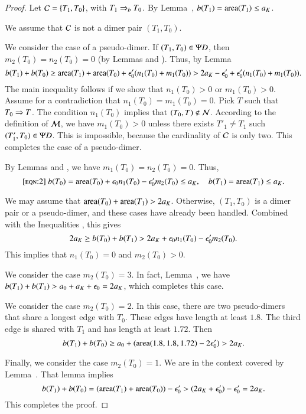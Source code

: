 \begin{proof}  Let $\mathcal C = \{T_1,T_0\}$, with $T_1\Rightarrow_{b} T_0$. By Lemma~,
$b(T_1)={\operatorname{area}}(T_1)\le a_K$.  

We assume that $\mathcal C$ is not a dimer pair $(T_1,T_0)$.


We consider the case of a pseudo-dimer.
If $(T_1,T_0)\in\Psi D$, then $m_2(T_0)=n_2(T_0)=0$ (by Lemmas  and ).
Thus, by Lemma~
\[
b(T_1)+b(T_0) \ge {\operatorname{area}}(T_1)+{\operatorname{area}}(T_0) + \epsilon_0' (n_1(T_0) + m_1(T_0)) > 2a_K - \epsilon_0'  + \epsilon_0' (n_1(T_0)+m_1(T_0)).
\]
The main inequality follows if we show that $n_1(T_0)>0$ or $m_1(T_0)>0$.
Assume for a contradiction that $n_1(T_0)=m_1(T_0)=0$.  Pick $T$ such that $T_0\Rightarrow T$.
The condition $n_1(T_0)$ implies that $(T_0,T)\not\in\mathcal N$.  According to the definition of $\mathcal M$, 
we have $m_1(T_0)>0$ unless
there exists $T'_1\ne T_1$ such $(T'_1,T_0)\in\Psi D$.  This is impossible, because the cardinality of $\mathcal C$ is only
two.  This completes the case of a pseudo-dimer.

By Lemmas  and , we have $m_1(T_0)=n_2(T_0)=0$.
Thus,
\begin{equation}\libel{eqn:2}
b(T_0) = \area(T_0) + \epso n_1(T_0) - \epso' m_2(T_0)\le \aK, \quad b(T_1) = \area(T_1) \le \aK.
\end{equation}

We may assume that  ${\operatorname{area}}(T_0)+{\operatorname{area}}(T_1)> 2a_K$.  Otherwise, $(T_1,T_0)$ is a dimer pair or 
a pseudo-dimer, and these cases have already been handled.  Combined with the Inequalities ,
this gives 
\[
2a_K \ge b(T_0) + b(T_1) > 2a_K + \epsilon_0 n_1(T_0) - \epsilon_0' m_2(T_0).
\]
This implies that $n_1(T_0)=0$ and $m_2(T_0) > 0$.

We consider the case $m_2(T_0)= 3$.  In fact, Lemma~, we have
$b(T_1) + b(T_1) > a_0 + a_K + \epsilon_0 = 2a_K$, which completes this case.

We consider the case $m_2(T_0)=2$.  In this case, there are two pseudo-dimers that share
a longest edge with $T_0$.  These edges have length at least $1.8$. The third edge
is shared with $T_1$ and has length at least $1.72$.
Then
\[
b(T_1)+b(T_0) \ge a_0 + ({\operatorname{area}} (1.8,1.8,1.72) - 2\epsilon_0') > 2a_K.
\]

Finally, we consider the case $m_2(T_0)=1$.  We are in the context covered
by Lemma~.  That lemma implies
\[
b(T_1) + b(T_0) = ({\operatorname{area}}(T_1) + {\operatorname{area}}(T_0)) - \epsilon_0' > (2a_K  +\epsilon_0') - \epsilon_0' = 2a_K.
\]
This completes the proof.
\end{proof}


